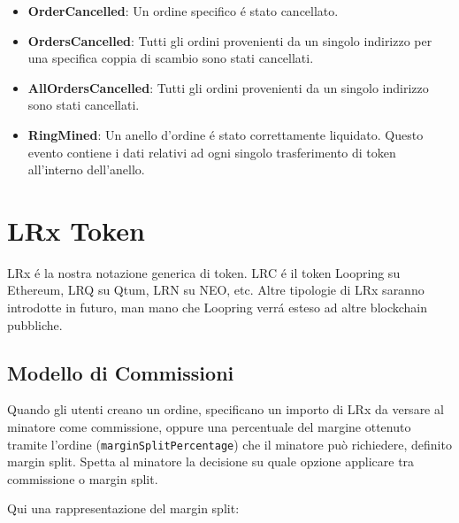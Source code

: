 \documentclass[UTF8,nofonts]{article}
\makeatletter
\newenvironment{figurehere}
 {\def\@captype{figure}}
 {}
\makeatother
\begin{document}
\begin{multicols}{2}
\begin{itemize}
	\item \textbf{OrderCancelled}: Un ordine specifico \'e stato cancellato.
	\item \textbf{OrdersCancelled}: Tutti gli ordini provenienti da un singolo indirizzo per una specifica coppia di scambio sono stati cancellati.
	\item \textbf{AllOrdersCancelled}: Tutti gli ordini provenienti da un singolo indirizzo sono stati cancellati.
	\item \textbf{RingMined}: Un anello d'ordine \'e stato correttamente liquidato. Questo evento contiene i dati relativi ad ogni singolo trasferimento di token all'interno dell'anello.
\end{itemize}


\section{LRx Token\label{sec:token}}
LRx \'e la nostra notazione generica di token. LRC \'e il token Loopring su Ethereum, LRQ su Qtum, LRN su NEO, etc. Altre tipologie di LRx saranno introdotte in futuro, man mano che Loopring verr\'a esteso ad altre blockchain pubbliche.

\subsection{Modello di Commissioni\label{sec:fee_model}}
Quando gli utenti creano un ordine, specificano un importo di LRx da versare al minatore come commissione, oppure una percentuale del margine ottenuto tramite l'ordine (\verb|marginSplitPercentage|)  che il minatore può richiedere, definito margin split. Spetta al minatore la decisione su quale opzione applicare tra commissione o margin split.

Qui una rappresentazione del margin split:

\begin{center}
\begin{figurehere}
\centering
{}
\end{figurehere}
\end{center}
\end{multicols}
\end{document}
